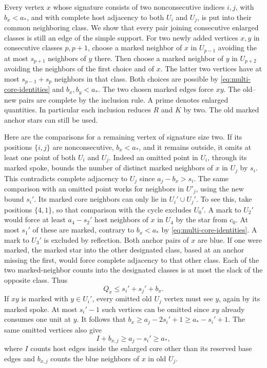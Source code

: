 \documentclass[preprint,11pt,numbers]{elsarticle-arxiv}
\numberwithin{equation}{section}
\theoremstyle{definition}
\begin{document}
Every vertex $x$ whose signature consists of two nonconsecutive indices $i,j$,
with $b_x<a_*$, and with complete host adjacency to both $U_i$ and
$U_j$, is put into their common neighboring class. We show that
every pair joining consecutive enlarged classes is still an edge
of the simple support. For two newly
added vertices $x,y$ in consecutive classes $p,p+1$, choose a marked
neighbor of $x$ in $U_{p-1}$ avoiding the at most $s_{p+1}$ neighbors
of $y$ there. Then choose a marked neighbor of $y$ in $U_{p+2}$ avoiding
the neighbors of the first choice and of $x$. The latter two vertices
have at most $s_{p-1}+s_p$ neighbors in that class. Both choices
are possible by \eqref{eq:multi-core-identities} and $b_x,b_y<a_*$.
The two chosen marked edges force $xy$. The old--new pairs are
complete by the inclusion rule. A prime denotes enlarged quantities.
In particular each inclusion reduces $R$ and $K$ by two. The old
marked anchor stars can still be used.

Here are the comparisons for a remaining vertex of signature size two. If its
positions $\{i,j\}$ are nonconsecutive, $b_x<a_*$, and
it remains outside, it omits at least one point of both $U_i$ and $U_j$.
Indeed an omitted point in $U_i$, through its marked spoke, bounds the
number of distinct marked neighbors of $x$ in $U_j$ by $s_i$. This
contradicts complete adjacency to $U_j$ since $a_j-b_x>s_i$.
The same comparison with an omitted point works for neighbors in
$U'_j$, using the new bound $s_i'$. Its marked core neighbors can only
lie in $U_i'\cup U_j'$. To see this, take positions $\{4,1\}$, so that
comparison with the cycle excludes $U_0'$. A mark to $U_2'$ would force
at least $a_4-s_2'$ host neighbors of $x$ in $U_4$ by the star from
$c_0$. At most $s_1'$ of these are marked, contrary to $b_x<a_*$
by \eqref{eq:multi-core-identities}. A mark to $U_3'$ is excluded by
reflection. Both anchor pairs of $x$ are blue. If one were marked,
the marked star into the other designated class, based at an anchor
missing the first, would force complete adjacency to that other
class. Each of the two marked-neighbor counts into the designated
classes is at most the slack of the opposite class. Thus
\begin{equation}\label{eq:multi-low-blue-outside}
 Q_x\le s_i'+s_j'+b_x.
\end{equation}
If $xy$ is marked with $y\in U_i'$, every omitted old $U_j$ vertex must
see $y$, again by its marked spoke. At most $s_i'-1$ such vertices
can be omitted since $xy$ already consumes one unit at $y$. It follows
that $b_x\ge a_j-2s_i'+1\ge a_*-s_i'+1$. The same omitted vertices
also give
\begin{equation}\label{eq:multi-rectangle}
 I+b_{x,j}\ge a_j-s_i'\ge a_*,
\end{equation}
where $I$ counts host edges inside the enlarged core other than its
reserved base edges and
$b_{x,j}$ counts the blue neighbors of $x$ in old $U_j$.
\end{document}
